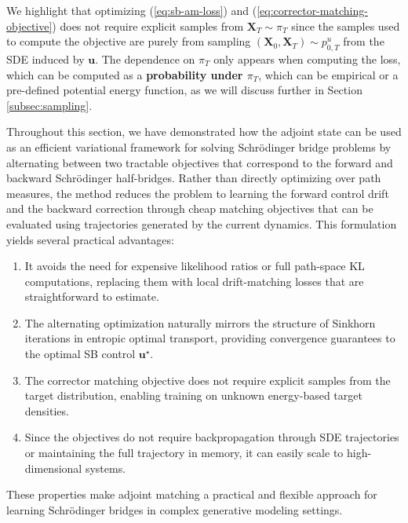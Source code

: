\documentclass{article}
\begin{document}
\begin{remark}\label{remark:corrector-match-data}
    We highlight that optimizing (\ref{eq:sb-am-loss}) and (\ref{eq:corrector-matching-objective}) does not require explicit samples from $\boldsymbol{X}_T\sim\pi_T$ since the samples used to compute the objective are purely from sampling $(\boldsymbol{X}_0, \boldsymbol{X}_T)\sim p^u_{0,T}$ from the SDE induced by $\boldsymbol{u}$. The dependence on $\pi_T$ only appears when computing the loss, which can be computed as a \textbf{probability under $\pi_T$}, which can be empirical or a pre-defined potential energy function, as we will discuss further in Section \ref{subsec:sampling}.
\end{remark}

Throughout this section, we have demonstrated how the adjoint state can be used as an efficient variational framework for solving Schrödinger bridge problems by alternating between two tractable objectives that correspond to the forward and backward Schrödinger half-bridges. Rather than directly optimizing over path measures, the method reduces the problem to learning the forward control drift and the backward correction through cheap matching objectives that can be evaluated using trajectories generated by the current dynamics. This formulation yields several practical advantages:
\begin{enumerate}
    \item [(i)] It avoids the need for expensive likelihood ratios or full path-space KL computations, replacing them with local drift-matching losses that are straightforward to estimate.
    \item[(ii)] The alternating optimization naturally mirrors the structure of Sinkhorn iterations in entropic optimal transport, providing convergence guarantees to the optimal SB control $\boldsymbol{u}^\star$.
    \item[(iii)] The corrector matching objective does not require explicit samples from the target distribution, enabling training on unknown energy-based target densities.
    \item[(iv)] Since the objectives do not require backpropagation through SDE trajectories or maintaining the full trajectory in memory, it can easily scale to high-dimensional systems. 
\end{enumerate}

These properties make adjoint matching a practical and flexible approach for learning Schrödinger bridges in complex generative modeling settings.
\end{document}
